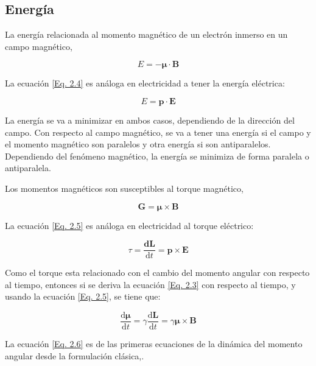 \documentclass[11pt,fleqn]{book}
\renewcommand{\vec}[1]{\mathbf{#1}}
\begin{document}
\subsection{Energía}
La energía relacionada al momento magnético de un electrón inmerso en un campo magnético,

\begin{equation}
    E=-\vec{\mu}\cdot\vec{B}
    \label{Eq. 2.4}
\end{equation}

La ecuación \ref{Eq. 2.4} es análoga en electricidad a tener la energía eléctrica:

\begin{equation*}
    E=\vec{p}\cdot\vec{E}
\end{equation*}

La energía se va a minimizar en ambos casos, dependiendo de la dirección del campo. Con respecto al campo magnético, se va a tener una energía si el campo y el momento magnético son paralelos y otra energía si son antiparalelos. Dependiendo del fenómeno magnético, la energía se minimiza de forma paralela o antiparalela.

Los momentos magnéticos son susceptibles al torque magnético,

\begin{equation}
    \vec{G}=\vec{\mu}\times\vec{B}
    \label{Eq. 2.5}
\end{equation}

La ecuación \ref{Eq. 2.5} es análoga en electricidad al torque eléctrico:

\begin{equation*}
    \tau=\frac{\mathbf{d}\vec{L}}{\mathrm{d}t}=\vec{p}\times\vec{E}
\end{equation*}

Como el torque esta relacionado con el cambio del momento angular con respecto al tiempo, entonces si se deriva la ecuación \ref{Eq. 2.3} con respecto al tiempo, y usando la ecuación \ref{Eq. 2.5}, se tiene que:

\begin{equation}
    \frac{\mathrm{d}\vec{\mu}}{\mathrm{d}t}=\gamma\frac{\mathrm{d}\vec{L}}{\mathrm{d}t}=\gamma\vec{\mu}\times\vec{B}
    \label{Eq. 2.6}
\end{equation}

La ecuación \ref{Eq. 2.6} es de las primeras ecuaciones de la dinámica del momento angular desde la formulación clásica,.
\end{document}
